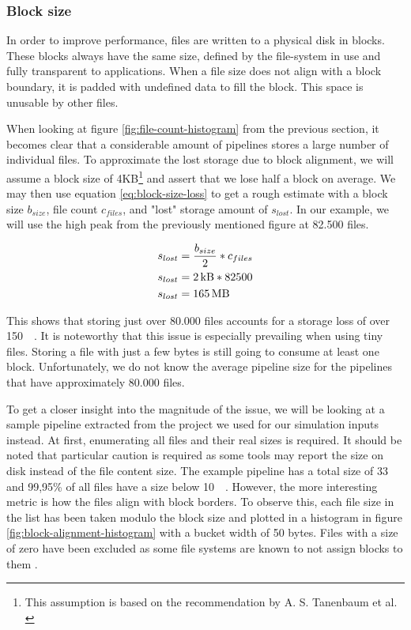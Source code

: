         \subsubsection{Block size}
            In order to improve performance, files are written to a physical disk in blocks. These blocks always have the same size, defined by the file-system in use and fully transparent to applications. When a file size does not align with a block boundary, it is padded with undefined data to fill the block. This space is unusable by other files. \cite{block-size-loss}
            
            When looking at figure \ref{fig:file-count-histogram} from the previous section, it becomes clear that a considerable amount of pipelines stores a large number of individual files. To approximate the lost storage due to block alignment, we will assume a block size of 4KB\footnote{This assumption is based on the recommendation by A. S. Tanenbaum et al. \cite{common-block-size}} and assert that we lose half a block on average. We may then use equation \ref{eq:block-size-loss} to get a rough estimate with a block size $b_{size}$, file count $c_{files}$, and "lost" storage amount of $s_{lost}$. In our example, we will use the high peak from the previously mentioned figure at 82.500 files.
            
            \begin{equation}\label{eq:block-size-loss}
                \begin{split}
                    s_{lost} & = \frac{b_{size}}{2} * c_{files}\\
                    s_{lost} & = \SI{2}{\kilo\byte} * 82500\\
                    s_{lost} & = \SI{165}{\mega\byte}
                \end{split}
            \end{equation}
            
            This shows that storing just over 80.000 files accounts for a storage loss of over \SI{150}{\mega\byte}. It is noteworthy that this issue is especially prevailing when using tiny files. Storing a file with just a few bytes is still going to consume at least one block. Unfortunately, we do not know the average pipeline size for the pipelines that have approximately 80.000 files.
            
            To get a closer insight into the magnitude of the issue, we will be looking at a sample pipeline extracted from the project we used for our simulation inputs instead. At first, enumerating all files and their real sizes is required. It should be noted that particular caution is required as some tools may report the size on disk instead of the file content size. The example pipeline has a total size of \SI{33}{\giga\byte} and 99,95\% of all files have a size below \SI{10}{\mega\byte}. However, the more interesting metric is how the files align with block borders. To observe this, each file size in the list has been taken modulo the block size and plotted in a histogram in figure \ref{fig:block-alignment-histogram} with a bucket width of 50 bytes. Files with a size of zero have been excluded as some file systems are known to not assign blocks to them \cite{empty-inode}.
            
